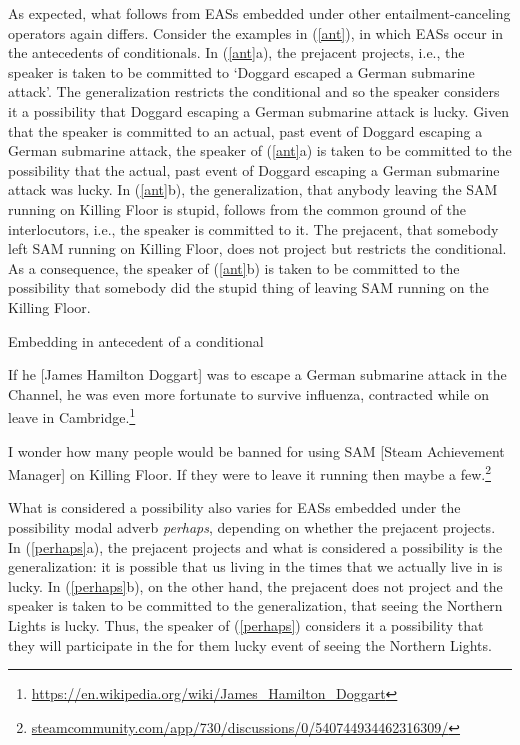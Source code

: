 \documentclass[11pt,fleqn]{article}
\newcommand{\6}{\mbox{$[\hspace*{-.6mm}[$}}
\newcommand{\9}{\mbox{$]\hspace*{-.6mm}]$}}
\begin{document}
As expected, what follows from EASs embedded under other entailment-canceling operators again differs. Consider the examples in (\ref{ant}), in which EASs occur in the antecedents of conditionals. In (\ref{ant}a), the prejacent projects, i.e., the speaker is taken to be committed to `Doggard escaped a German submarine attack'. The generalization restricts the conditional and so the speaker considers it a possibility that Doggard escaping a German submarine attack is lucky. Given that the speaker is committed to an actual, past event of Doggard escaping a German submarine attack, the speaker of (\ref{ant}a) is taken to be committed to the possibility that the actual, past event of Doggard escaping a German submarine attack was lucky. In (\ref{ant}b), the generalization, that anybody leaving the SAM running on Killing Floor is stupid, follows from the common ground of the interlocutors, i.e., the speaker is committed to it. The prejacent, that somebody left SAM running on Killing Floor, does not project but restricts the conditional. As a consequence, the speaker of (\ref{ant}b) is taken to be committed to the possibility that somebody did the stupid thing of leaving SAM running on the Killing Floor.

\begin{exe}
\ex\label{ant} Embedding in antecedent of a conditional
\begin{xlist}

\ex If he [James Hamilton Doggart] was  to escape a German submarine attack in the Channel, he was even more fortunate to survive influenza, contracted while on leave in Cambridge.\footnote{\url{https://en.wikipedia.org/wiki/James_Hamilton_Doggart}}


\ex 
\begin{xlist}
 I wonder how many people would be banned for using SAM [Steam Achievement Manager] on Killing Floor.
 If they were  to leave it running then maybe a few.\footnote{\url{steamcommunity.com/app/730/discussions/0/540744934462316309/}}

\end{xlist} 
\end{xlist}
\end{exe}

What is considered a possibility also varies for EASs embedded under the possibility modal adverb {\em perhaps}, depending on whether the prejacent projects. In (\ref{perhaps}a), the prejacent projects and what is considered a possibility is the generalization: it is possible that us living in the times that we actually live in is lucky. In (\ref{perhaps}b), on the other hand, the prejacent does not project and the speaker is taken to be committed to the generalization, that seeing the Northern Lights is lucky. Thus, the speaker of (\ref{perhaps}) considers it a possibility that they will participate in the for them lucky event of seeing the Northern Lights. 
\end{document}
